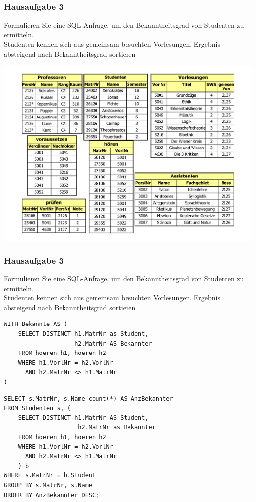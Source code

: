 \begin{frame}[fragile]
	\frametitle{Hausaufgabe 3}
	\vspace{0.5cm}

	\begin{multicols}{2}
		Formulieren Sie eine SQL-Anfrage, um den Bekanntheitsgrad von Studenten zu ermitteln. \\
		Studenten kennen sich aus gemeinsam besuchten Vorlesungen.
		Ergebnis absteigend nach Bekanntheitsgrad sortieren
		\vfill\columnbreak

		\begin{center}
			\includegraphics[height=.6\paperheight]{../img/uni.pdf}
		\end{center}
	\end{multicols}
\end{frame}

\begin{frame}[fragile]
	\frametitle{Hausaufgabe 3}
	\vspace{0.5cm}

	\begin{multicols}{2}
		Formulieren Sie eine SQL-Anfrage, um den Bekanntheitsgrad von Studenten zu ermitteln. \\
		Studenten kennen sich aus gemeinsam besuchten Vorlesungen.
		Ergebnis absteigend nach Bekanntheitsgrad sortieren

		\begin{verbatim}
WITH Bekannte AS (
	SELECT DISTINCT h1.MatrNr as Student,
	                h2.MatrNr AS Bekannter
	FROM hoeren h1, hoeren h2
	WHERE h1.VorlNr = h2.VorlNr
	  AND h2.MatrNr <> h1.MatrNr
)
		\end{verbatim}
		\vfill\columnbreak
		\begin{verbatim}
SELECT s.MatrNr, s.Name count(*) AS AnzBekannter
FROM Studenten s, (
	SELECT DISTINCT h1.MatrNr AS Student, 
	                 h2.MatrNr as Bekannter
	FROM hoeren h1, hoeren h2
	WHERE h1.VorlNr = h2.VorlNr
	  AND h2.MatrNr <> h1.MatrNr
	) b
WHERE s.MatrNr = b.Student
GROUP BY s.MatrNr, s.Name
ORDER BY AnzBekannter DESC;
		\end{verbatim}
	\end{multicols}
\end{frame}


